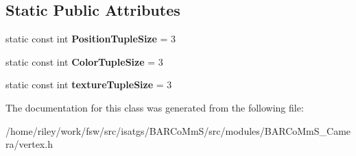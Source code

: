 \subsection*{Static Public Attributes}
\begin{DoxyCompactItemize}
\item 
static const int {\bfseries Position\+Tuple\+Size} = 3\hypertarget{class_vertex_a8ddae32c242e3c94f94a7565966a86ca}{}\label{class_vertex_a8ddae32c242e3c94f94a7565966a86ca}

\item 
static const int {\bfseries Color\+Tuple\+Size} = 3\hypertarget{class_vertex_a5a1d4d101c9d2272c659ad72fa8a83ff}{}\label{class_vertex_a5a1d4d101c9d2272c659ad72fa8a83ff}

\item 
static const int {\bfseries texture\+Tuple\+Size} = 3\hypertarget{class_vertex_af2bb5234207f94cb2d9ca4f6ecaf3fce}{}\label{class_vertex_af2bb5234207f94cb2d9ca4f6ecaf3fce}

\end{DoxyCompactItemize}


The documentation for this class was generated from the following file\+:\begin{DoxyCompactItemize}
\item 
/home/riley/work/fsw/src/isatgs/\+B\+A\+R\+Co\+Mm\+S/src/modules/\+B\+A\+R\+Co\+Mm\+S\+\_\+\+Camera/vertex.\+h\end{DoxyCompactItemize}
